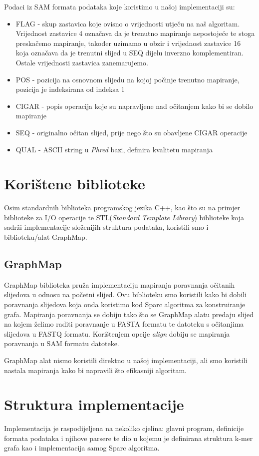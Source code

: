 \documentclass[times, utf8, seminar, numeric]{fer}
\begin{document}
Podaci iz SAM formata podataka koje koristimo u našoj implementaciji su:
\renewcommand{\labelitemi}{$\bullet$}
\begin{itemize}
	\item FLAG - skup zastavica koje ovisno o vrijednosti utječu na naš algoritam. Vrijednost zastavice 4 označava da je trenutno mapiranje nepostojeće te stoga preskačemo mapiranje, također uzimamo u obzir i vrijednost zastavice 16 koja označava da je trenutni slijed u SEQ dijelu inverzno komplementiran. Ostale vrijednosti zastavica zanemarujemo.  
	\item POS - pozicija na osnovnom slijedu na kojoj počinje trenutno mapiranje, pozicija je indeksirana od indeksa 1
	\item CIGAR - popis operacija koje su napravljene nad očitanjem kako bi se dobilo mapiranje
	\item SEQ - originalno očitan slijed, prije nego što su obavljene CIGAR operacije
	\item QUAL - ASCII string u \emph{Phred} bazi, definira kvalitetu mapiranja
\end{itemize}

\section{Korištene biblioteke}
Osim standardnih biblioteka programskog jezika C++, kao što su na primjer biblioteke za I/O operacije te STL(\emph{Standard Template Library}) biblioteke koja sadrži implementacije složenijih struktura podataka, koristili smo i biblioteku/alat GraphMap.
\subsection{GraphMap} 
GraphMap \cite{graphmap} biblioteka pruža implementaciju mapiranja poravnanja očitanih slijedova u odnosu na početni slijed. Ovu biblioteku smo koristili kako bi dobili poravnanja slijedova koja onda koristimo kod Sparc algoritma za konstruiranje grafa. Mapiranja poravnanja se dobiju tako što se GraphMap alatu predaju slijed na kojem želimo raditi poravnanje u FASTA formatu te datoteku s očitanjima slijedova u FASTQ formatu. Korištenjem opcije \emph{align} dobiju se mapiranja poravnanja u SAM formatu datoteke.

GraphMap alat nismo koristili direktno u našoj implementaciji, ali smo koristili nastala mapiranja kako bi napravili što efikasniji algoritam.

\section{Struktura implementacije}
Implementacija je raspodijeljena na nekoliko cjelina: glavni program, definicije formata podataka i njihove parsere te dio u kojemu je definirana struktura k-mer grafa kao i implementacija samog Sparc algoritma.
\end{document}
